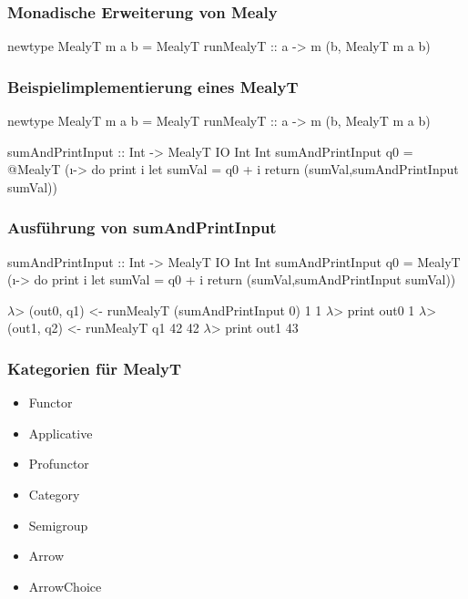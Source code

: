 \begin{frame}[fragile]
  \frametitle{Monadische Erweiterung von {\ttfamily Mealy}}
  \begin{haskell}[label={lst:haskell-mealy},caption={[Monadische Mealy]Monadische Mealy}]
newtype MealyT m a b = MealyT {
  runMealyT :: a -> m (b, MealyT m a b)
}
  \end{haskell}
\end{frame}

\begin{frame}[fragile]
  \frametitle{Beispielimplementierung eines {\ttfamily MealyT}}

  \begin{haskell}[label={lst:haskell-mealy}]
newtype MealyT m a b = MealyT {
  runMealyT :: a -> m (b, MealyT m a b)
}
  \end{haskell}

  \begin{haskell}
sumAndPrintInput :: Int -> MealyT IO Int Int
sumAndPrintInput q0 = @\pause@ MealyT (\i -> do
  print i
  let sumVal = q0 + i
  return (sumVal,sumAndPrintInput sumVal))
  \end{haskell}
\end{frame}

\begin{frame}[fragile]
  \frametitle{Ausführung von {\ttfamily sumAndPrintInput}}

  \begin{haskell}
sumAndPrintInput :: Int -> MealyT IO Int Int
sumAndPrintInput q0 = MealyT (\i -> do
  print i
  let sumVal = q0 + i
  return (sumVal,sumAndPrintInput sumVal))
  \end{haskell}
  \begin{haskell}[mathescape]
$\lambda$> (out0, q1) <- runMealyT (sumAndPrintInput 0) 1
1
$\lambda$> print out0
1
$\lambda$> (out1, q2) <- runMealyT q1 42
42
$\lambda$> print out1
43
  \end{haskell}
\end{frame}

\begin{frame}

  \frametitle{Kategorien für {\ttfamily MealyT}}

  \begin{itemize}
    \item {\ttfamily Functor}
    \item {\ttfamily Applicative}
    \item {\ttfamily Profunctor}
    \item {\ttfamily Category}
    \item {\ttfamily Semigroup}
    \item {\ttfamily Arrow}
    \item {\ttfamily ArrowChoice}
  \end{itemize}
\end{frame}

